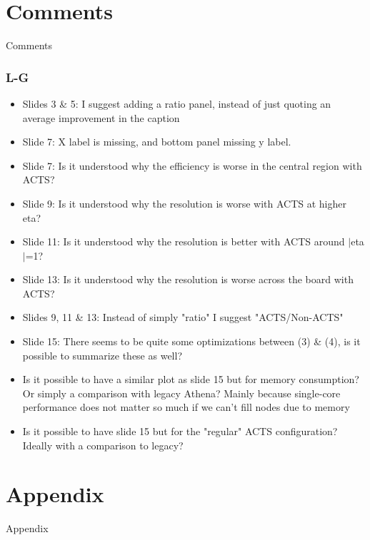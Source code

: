 \documentclass[aspectratio=169]{beamer}
\begin{document}
\section*{Comments}
\begin{frame}[plain]
  \centering
  \Huge Comments
\end{frame}

\begin{frame}
\frametitle{L-G}
\small
\begin{itemize}
\item Slides 3 \& 5: I suggest adding a ratio panel, instead of just quoting an average improvement in the caption
\item Slide 7: X label is missing, and bottom panel missing y label.
\item Slide 7: Is it understood why the efficiency is worse in the central region with ACTS?
\item Slide 9: Is it understood why the resolution is worse with ACTS at higher eta?
\item Slide 11: Is it understood why the resolution is better with ACTS around $|$eta$|$=1?
\item Slide 13: Is it understood why the resolution is worse across the board with ACTS?
\item Slides 9, 11 \& 13: Instead of simply "ratio" I suggest "ACTS/Non-ACTS"
\item Slide 15: There seems to be quite some optimizations between (3) \& (4), is it possible to summarize these as well?
\item Is it possible to have a similar plot as slide 15 but for memory consumption? Or simply a comparison with legacy Athena? Mainly because single-core performance does not matter so much if we can't fill nodes due to memory
\item Is it possible to have slide 15 but for the "regular" ACTS configuration? Ideally with a comparison to legacy?
\end{itemize}
\end{frame}

\section*{Appendix}
\begin{frame}[plain]
  \centering
  \Huge Appendix
\end{frame}
\end{document}
